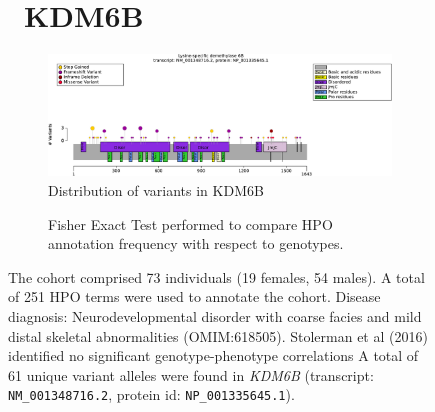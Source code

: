 \begin{figure}[htbp]
\section*{ KDM6B}
\centering
\begin{subfigure}[b]{0.95\textwidth}
\centering
\includegraphics[width=\textwidth]{ img/KDM6B_protein_diagram.pdf} 
\captionsetup{justification=raggedright,singlelinecheck=false}
\caption{Distribution of variants in KDM6B}
\end{subfigure}

\vspace{2em}

\begin{subfigure}[b]{0.95\textwidth}
\centering
{}
\captionsetup{justification=raggedright,singlelinecheck=false}
\caption{Fisher Exact Test performed to compare HPO annotation frequency with respect to genotypes. }
\end{subfigure}

\vspace{2em}

\caption{The cohort comprised 73 individuals (19 females, 54 males). A total of 251 HPO terms were used to annotate the cohort. Disease diagnosis: Neurodevelopmental disorder with coarse facies and mild distal skeletal abnormalities (OMIM:618505). Stolerman et al (2016) identified no significant genotype-phenotype correlations \cite{PMID_31124279} A total of 61 unique variant alleles were found in \textit{KDM6B} (transcript: \texttt{NM\_001348716.2}, protein id: \texttt{NP\_001335645.1}).}
\end{figure}
